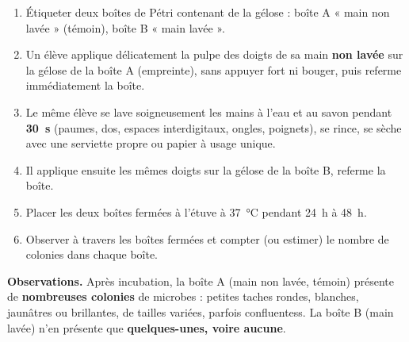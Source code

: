 \documentclass[11pt]{article}
\begin{document}
\begin{experience}
\begin{enumerate}
\item Étiqueter deux boîtes de Pétri contenant de la gélose : boîte A « main non lavée » (témoin), boîte B « main lavée ».
\item Un élève applique délicatement la pulpe des doigts de sa main \textbf{non lavée} sur la gélose de la boîte A (empreinte), sans appuyer fort ni bouger, puis referme immédiatement la boîte.
\item Le même élève se lave soigneusement les mains à l'eau et au savon pendant \textbf{\SI{30}{\second}} (paumes, dos, espaces interdigitaux, ongles, poignets), se rince, se sèche avec une serviette propre ou papier à usage unique.
\item Il applique ensuite les mêmes doigts sur la gélose de la boîte B, referme la boîte.
\item Placer les deux boîtes fermées à l'étuve à \SI{37}{\celsius} pendant \SI{24}{\hour} à \SI{48}{\hour}.
\item Observer à travers les boîtes fermées et compter (ou estimer) le nombre de colonies dans chaque boîte.
\end{enumerate}
\end{experience}

\textbf{Observations.} Après incubation, la boîte A (main non lavée, témoin) présente de \textbf{nombreuses colonies} de microbes : petites taches rondes, blanches, jaunâtres ou brillantes, de tailles variées, parfois confluentess. La boîte B (main lavée) n'en présente que \textbf{quelques-unes, voire aucune}.
\end{document}

